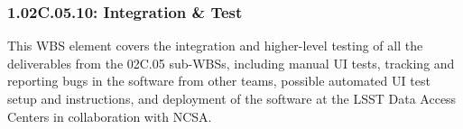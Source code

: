 \subsubsection*{1.02C.05.10: Integration \& Test}

This WBS element covers the integration and higher-level testing of all the deliverables from the 02C.05 sub-WBSs, including manual UI tests, tracking and reporting bugs in the software from other teams, possible automated UI test setup and instructions, and deployment of the software at the LSST Data Access Centers in collaboration with NCSA.
